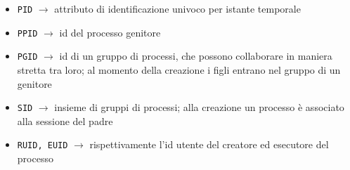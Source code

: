 \documentclass[11pt]{article}
\begin{document}
\begin{itemize}
    \item \verb|PID| $\rightarrow$ attributo di identificazione univoco per istante temporale
    \item \verb|PPID| $\rightarrow$ id del processo genitore
    \item \verb|PGID| $\rightarrow$ id di un gruppo di processi, che possono collaborare in maniera stretta tra loro; al momento della creazione i figli entrano nel gruppo di un genitore
    \item \verb|SID| $\rightarrow$ insieme di gruppi di processi; alla creazione un processo è associato alla sessione del padre
    \item \verb|RUID, EUID| $\rightarrow$ rispettivamente l'id utente del creatore ed esecutore del processo
\end{itemize}
\end{document}
